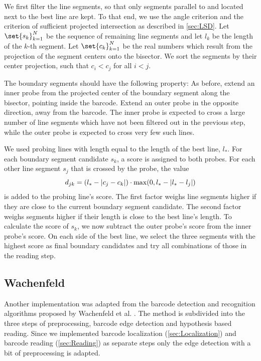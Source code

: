 We first filter the line segments, so that only segments parallel to and located
next to the best line are kept. To that end, we use the angle criterion and the
criterion of sufficient projected intersection as described in \cref{sec:LSD}.
Let $\set{s_k}_{k=1}^N$ be the sequence of remaining line segments and let
$l_k$ be the length of the $k$-th segment. Let $\set{c_k}_{k=1}^N$ be the
real numbers which result from the projection of the segment centers onto the
bisector. We sort the segments by their center projection, such that $c_i<c_j$ for all $i<j$.

The boundary segments should have the following
property: As before, extend an inner probe from the projected center of the
boundary segment along the bisector, pointing inside the barcode. Extend an
outer probe in the opposite direction, away from the barcode. The inner probe is
expected to cross a large number of line segments which have not been filtered
out in the previous step, while the outer probe is expected to cross very few such
lines.

We used probing lines with length equal to the length of the best line, $l_*$.
For each boundary segment candidate $s_k$, a score is assigned to both probes. For each other
line segment $s_j$ that is crossed by the probe, the value
\begin{equation*}
 d_{jk}=(l_*-\lvert c_j-c_k\rvert)\cdot \max(0, l_*-\lvert l_*-l_j\rvert)
\end{equation*}
is added to the probing line's score.
The first factor weighs line segments higher if they are close to the
current boundary segment candidate. The second factor weighs segments higher if
their length is close to the best line's length.
To calculate the score of $s_k$, we now subtract the outer probe's score from the inner
probe's score.
On each side of the best line, we select the three segments with the highest
score as final boundary candidates and try all combinations of those in the reading step.

\subsection[Wachenfeld]{Wachenfeld}
Another implementation was adapted from the barcode detection and recognition algorithms proposed by Wachenfeld et al. \cite{wachenfeld2008robust}. The method is subdivided into the three steps of preprocessing, barcode edge detection and hypothesis based reading. Since we implemented barcode localization (\cref{sec:Localization}) and barcode reading (\cref{sec:Reading}) as separate steps only the edge detection with a bit of preprocessing is adapted.

